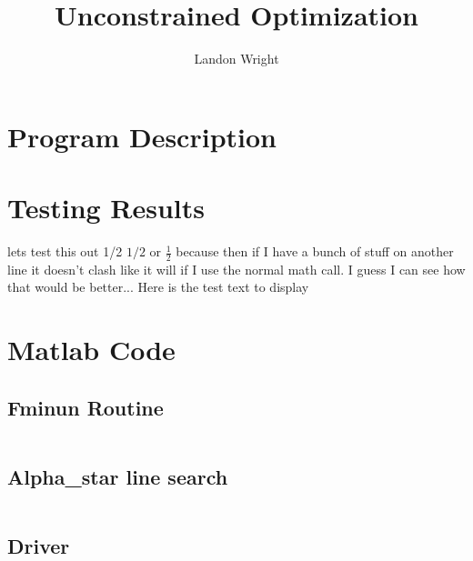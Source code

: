 \documentclass{article}
\newcommand{\test}{Here is the test text to display}
\begin{document}
\title{Unconstrained Optimization}
\author{Landon Wright}
\maketitle
\section{Program Description}
\section{Testing Results}
lets test this out 1/2 $1/2$ or $\frac{1}{2}$ because then if I have a bunch of stuff on another line it doesn't clash like it will if I use the normal math call.  I guess I can see how that would be better... \test
\section{Matlab Code}
\subsection{Fminun Routine}
\inputminted[xleftmargin=20pt,linenos]{matlab}{fminun.m}
\subsection{Alpha\_star line search}
\inputminted[xleftmargin=20pt, linenos]{matlab}{aPrime.m}
\subsection{Driver}
\inputminted[xleftmargin=20pt,linenos]{matlab}{fminunDriv.m}


\end{document}
